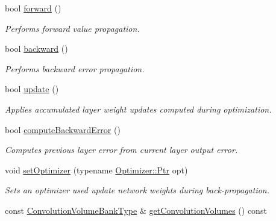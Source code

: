 \begin{DoxyCompactItemize}
bool \hyperlink{classffnn_1_1layer_1_1_convolution_abb5a0822c5af574633a17f686191ab61}{forward} ()
\begin{DoxyCompactList}\small\item\em Performs forward value propagation. \end{DoxyCompactList}\item 
bool \hyperlink{classffnn_1_1layer_1_1_convolution_a3f68ea1af0d1c6a3f4d8d8ee59d73bd4}{backward} ()
\begin{DoxyCompactList}\small\item\em Performs backward error propagation. \end{DoxyCompactList}\item 
bool \hyperlink{classffnn_1_1layer_1_1_convolution_adda31ab384f91bba27443e19cf7c2dc5}{update} ()
\begin{DoxyCompactList}\small\item\em Applies accumulated layer weight updates computed during optimization. \end{DoxyCompactList}\item 
bool \hyperlink{classffnn_1_1layer_1_1_convolution_a2e149846666213241b9a31ef2f8ec517}{compute\-Backward\-Error} ()
\begin{DoxyCompactList}\small\item\em Computes previous layer error from current layer output error. \end{DoxyCompactList}\item 
void \hyperlink{classffnn_1_1layer_1_1_convolution_a806640b761a67cde107646c1561c2932}{set\-Optimizer} (typename \hyperlink{classffnn_1_1optimizer_1_1_optimizer_ac03e7181934bf0c12a97fc67a60484ab}{Optimizer\-::\-Ptr} opt)
\begin{DoxyCompactList}\small\item\em Sets an optimizer used update network weights during back-\/propagation. \end{DoxyCompactList}\item 
const \hyperlink{classffnn_1_1layer_1_1_convolution_a9cec43e24f084c141c0cc8ae3c046ff4}{Convolution\-Volume\-Bank\-Type} \& \hyperlink{classffnn_1_1layer_1_1_convolution_ab7cd47d35f92a5dbc439a33a9af8ce97}{get\-Convolution\-Volumes} () const 
\end{DoxyCompactItemize}
